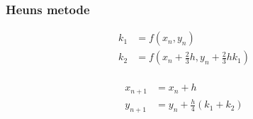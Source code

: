 %
%
\begin{frame}
\frametitle{Heuns metode }
\begin{minipage}[t]{0.31\textwidth}
\begin{align*}
k_1 & = f(x_n , y_n) \\
k_2 & = f \left( x_n + \frac{2}{3} h , y_n  + \frac{2}{3} h k_1 \right) \\
\end{align*}
%
\end{minipage} 
\phantom{Hej}
\begin{minipage}[t]{0.31\textwidth}
\begin{align*}
x_{n+1} & = x_n+h \\
y_{n+1} & = y_n + \frac{h}{4} (k_1 + k_2 )  \\
\end{align*}
%
\end{minipage} 
\\

\\
\phantom{H}
\\
\end{frame}